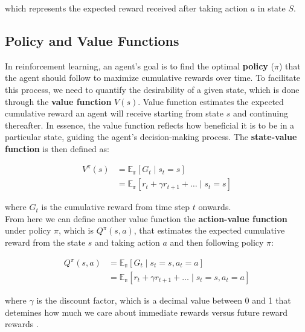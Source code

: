 which represents the expected reward received after taking action $a$ in state
$S$.
\subsection{Policy and Value Functions}
In reinforcement learning, an agent's goal is to find the optimal \textbf{policy} ($\pi$) that
the agent should follow to maximize cumulative rewards over time. To facilitate
this process, we need to quantify the desirability of a given state, which is
done through the \textbf{value function} $V(s)$. Value function estimates the
expected cumulative reward an agent will receive starting from state \( s \)
and continuing thereafter. In essence, the value function reflects how
beneficial it is to be in a particular state, guiding the agent's
decision-making process. The \textbf{state-value function} is then defined as:

\begin{equation}\label{eq:v_pi}
    \begin{split}
        V^\pi(s) & = \mathbb{E_\pi}[G_t \mid s_t = s]                            \\
                 & = \mathbb{E_\pi}[r_t + \gamma r_{t+1}  + \ldots \mid s_t = s]
    \end{split}
\end{equation}

where \( G_t \) is the cumulative reward from time step $t$ onwards\cite{bg2}. \\

From here we can define another value function the \textbf{action-value function} under
policy $\pi$, which is $Q^\pi(s, a)$, that estimates the expected cumulative
reward from the state $s$ and taking action $a$ and then following policy
$\pi$:

\begin{equation}\label{eq:q_pi}
    \begin{split}
        Q^\pi(s, a) & = \mathbb{E_\pi}[G_t \mid s_t = s, a_t = a]                            \\
                    & = \mathbb{E_\pi}[r_t + \gamma r_{t+1}  + \ldots \mid s_t = s, a_t = a]
    \end{split}
\end{equation}

where $\gamma$ is the discount factor, which is a decimal value between 0 and 1
that detemines how much we care about immediate rewards versus future reward
rewards \cite{bg2}.\\

